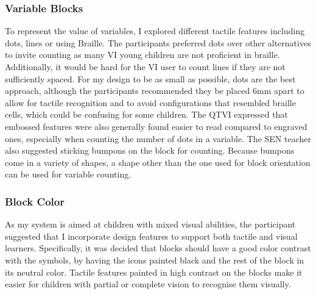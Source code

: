 \documentclass[oneside,%
                    author={Malak Hajji},
                    degree={BSc},
                    title={Designing An Accessible Computational Toolkit For Students},
                  subtitle={With Mixed Visual Abilities}]{dissertation}
\begin{document}
\subsubsection{Variable Blocks}
To represent the value of variables, I explored different tactile features including dots, lines or using Braille.
The participants preferred dots over other alternatives to invite counting as many VI young children are not proficient in braille. Additionally, it would be hard for the VI user to count lines if they are not sufficiently spaced. For my design to be as small as possible, dots are the best approach, although the participants recommended they be placed 6mm apart to allow for tactile recognition and to avoid configurations that resembled braille cells, which could be confusing for some children. The QTVI expressed that embossed features were also generally found easier to read compared to engraved ones, especially when counting the number of dots in a variable. The SEN teacher also suggested sticking bumpons on the block for counting. Because bumpons come in a variety of shapes, a shape other than the one used for block orientation can be used for variable counting.
\subsubsection{Block Color}
As my system is aimed at children with mixed visual abilities, the participant suggested that I incorporate design features to support both tactile and visual learners. Specifically, it was decided that blocks should have a good color contrast with the symbols, by having the icons painted black and the rest of the block in its neutral color. Tactile features painted in high contrast on the blocks make it easier for children with partial or complete vision to recognise them visually.
\end{document}
